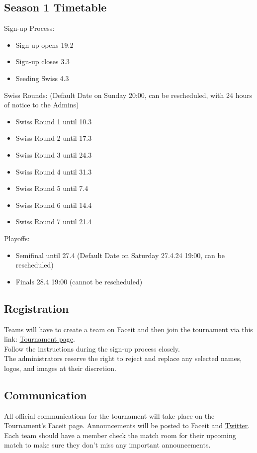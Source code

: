 \documentclass{article}
\def\twitter{\href{https://twitter.com/chcsleague}{Twitter}}
\begin{document}
\subsection{Season 1 Timetable}
Sign-up Process:
\begin{itemize}
\item Sign-up opens 19.2
\item Sign-up closes 3.3
\item Seeding Swiss 4.3
\end{itemize}
Swiss Rounds: (Default Date on Sunday 20:00, can be rescheduled, with 24 hours of notice to the Admins)
\begin{itemize}
\item Swiss Round 1 until 10.3
\item Swiss Round 2 until 17.3
\item Swiss Round 3 until 24.3
\item Swiss Round 4 until 31.3
\item Swiss Round 5 until 7.4
\item Swiss Round 6 until 14.4
\item Swiss Round 7 until 21.4
\end{itemize}
Playoffs:
\begin{itemize}
\item Semifinal until 27.4 (Default Date on Saturday 27.4.24 19:00, can be rescheduled)
\item Finals 28.4 19:00 (cannot be rescheduled)
\end{itemize}

\subsection{Registration}
Teams will have to create a team on Faceit and then join the tournament via this link: \href{www.google.com}{Tournament page}.\\
Follow the instructions during the sign-up process closely.\\
The administrators reserve the right to reject and replace any selected names, logos, and images at their discretion. 

\subsection{Communication}
All official communications for the tournament will take place on the Tournament's Faceit page. Announcements will be posted to Faceit and \twitter. Each team should have a member check the match room for their upcoming match to make sure they don't miss any important announcements. 
\end{document}
